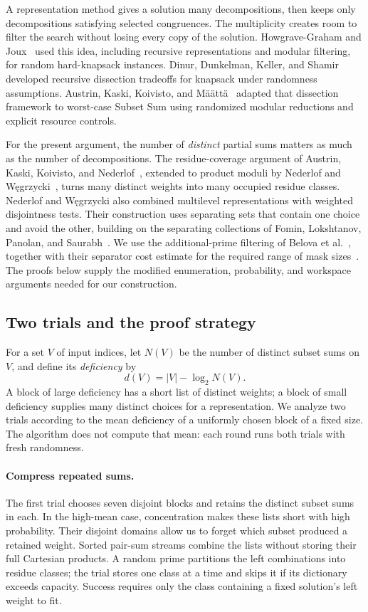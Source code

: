 A representation method gives a solution many decompositions, then
keeps only decompositions satisfying selected congruences. The
multiplicity creates room to filter the search without losing every
copy of the solution. Howgrave-Graham and Joux~\cite{HJ10} used this
idea, including recursive representations and modular filtering, for
random hard-knapsack instances. Dinur, Dunkelman, Keller, and
Shamir~\cite{DDKS12} developed recursive dissection tradeoffs for
knapsack under randomness assumptions. Austrin, Kaski, Koivisto, and
M\"a\"att\"a~\cite{AKKM13} adapted that dissection framework to
worst-case Subset Sum using randomized modular reductions and explicit
resource controls.

For the present argument, the number of \emph{distinct} partial sums
matters as much as the number of decompositions. The residue-coverage
argument of Austrin, Kaski, Koivisto, and
Nederlof~\cite[Proposition~3.5]{AKKN16}, extended to product moduli by
Nederlof and W\k{e}grzycki~\cite[full version, Lemma~3.2]{NW21},
turns many distinct weights into many occupied residue classes.
Nederlof and W\k{e}grzycki also combined multilevel representations
with weighted disjointness tests. Their construction uses separating
sets that contain one choice and avoid the other, building on the
separating collections of Fomin, Lokshtanov, Panolan, and
Saurabh~\cite[Section~4.2]{FLPS16}. We use the additional-prime
filtering of Belova et al.~\cite[full version, Sections~1.2.3 and~4.1]{BCKM24},
together with their separator cost estimate for the required range of
mask sizes~\cite[full version, Section~4.7]{BCKM24}.
The proofs below supply the modified enumeration, probability, and
workspace arguments needed for our construction.

\subsection{Two trials and the proof strategy}

For a set $V$ of input indices, let $N(V)$ be the number of distinct
subset sums on $V$, and define its \emph{deficiency} by
\[
 d(V)=|V|-\log_2N(V).
\]
A block of large deficiency has a short list of distinct weights;
a block of small deficiency supplies many distinct choices for a
representation. We analyze two trials according to the mean deficiency
of a uniformly chosen block of a fixed size. The algorithm does not
compute that mean: each round runs both trials with fresh randomness.

\paragraph{Compress repeated sums.}
The first trial chooses seven disjoint blocks and retains the distinct
subset sums in each. In the high-mean case, concentration makes these
lists short with high probability. Their disjoint domains allow us to
forget which subset produced a retained weight. Sorted pair-sum streams
combine the lists without storing their full Cartesian products. A
random prime partitions the left combinations into residue classes;
the trial stores one class at a time and skips it if its dictionary
exceeds capacity. Success requires only the class containing a fixed
solution's left weight to fit.


